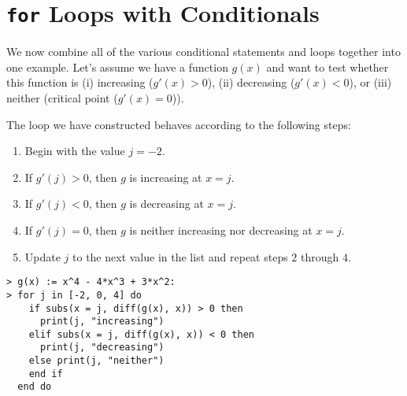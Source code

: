 

\section{\texttt{for} Loops with Conditionals}
\label{sec:for_loops_with_conditionals}

We now combine all of the various conditional statements and loops together into one example. Let's assume we have a function $g(x)$ and want to test whether this function is (i) increasing ($g'(x) > 0$), (ii) decreasing ($g'(x) < 0$), or (iii) neither (critical point ($g'(x) = 0$)).

The loop we have constructed behaves according to the following steps:


\begin{enumerate}
	\item Begin with the value $j=-2$.
	\item If $g'(j)>0$, then $g$ is increasing at $x=j$.
	\item If $g'(j)<0$, then $g$ is decreasing at $x=j$.
	\item If $g'(j)=0$, then $g$ is neither increasing nor decreasing at $x=j$.
	\item Update $j$ to the next value in the list and repeat steps $2$ through $4$.
\end{enumerate}

\begin{maplegroup}
\begin{mapleinput}
\begin{verbatim}
> g(x) := x^4 - 4*x^3 + 3*x^2:
> for j in [-2, 0, 4] do
    if subs(x = j, diff(g(x), x)) > 0 then
      print(j, "increasing")
    elif subs(x = j, diff(g(x), x)) < 0 then
      print(j, "decreasing")
    else print(j, "neither")
    end if
  end do
\end{verbatim}
\end{mapleinput}
\mapleresult
\begin{maplelatex}
\end{maplelatex}
\mapleresult
\begin{maplelatex}
\end{maplelatex}
\mapleresult
\begin{maplelatex}
\end{maplelatex}
\end{maplegroup}


